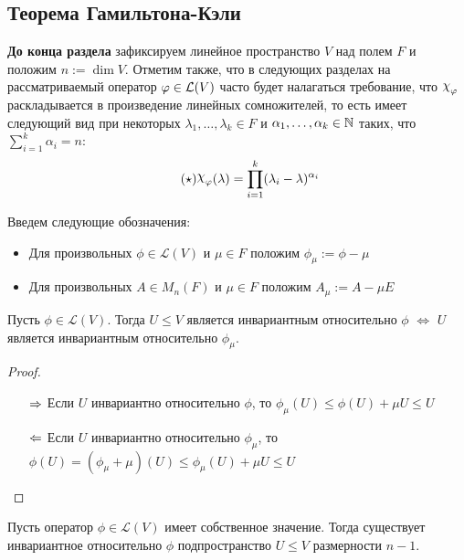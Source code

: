 \subsection{Теорема Гамильтона-Кэли}

\textbf{До конца раздела} зафиксируем линейное пространство $V$ над полем $F$ и положим $n := \dim{V}$. Отметим также, что в следующих разделах на рассматриваемый оператор $\phi \hm{\in} \mathcal{L}(V)$ часто будет налагаться требование, что $\Chi_\phi$ раскладывается в произведение линейных сомножителей, то есть имеет следующий вид при некоторых $\lambda_1, \dotsc, \lambda_k \in F$ и $\alpha_1, \dotsc, \alpha_k \in \mathbb{N}$ таких, что $\sum_{i = 1}^k\alpha_i = n$:
\begin{equation}\tag{$\star$}\label{charpol}
	\Chi_\phi(\lambda) = \prod_{i = 1}^k(\lambda_i - \lambda)^{\alpha_i}
\end{equation}

\begin{definition}
	Введем следующие обозначения:
	\begin{itemize}
		\item Для произвольных $\phi \in \mathcal{L}(V)$ и $\mu \in F$ положим $\phi_\mu := \phi - \mu$
		\item Для произвольных $A \in M_n(F)$ и $\mu \in F$ положим $A_\mu := A - \mu E$
	\end{itemize}
\end{definition}

\begin{proposition}
	Пусть $\phi \in \mathcal{L}(V)$. Тогда $U \le V$ является инвариантным относительно $\phi$ $\Leftrightarrow$ $U$ является инвариантным относительно $\phi_\mu$.
\end{proposition}

\begin{proof}~
	\begin{itemize}
		\item[$\Rightarrow$] Если $U$ инвариантно относительно $\phi$, то $\phi_\mu(U) \le \phi(U) + \mu U \le U$
		\item[$\Leftarrow$] Если $U$ инвариантно относительно $\phi_\mu$, то $\phi(U) = (\phi_\mu + \mu)(U) \le \phi_\mu(U) + \mu U \le U$\qedhere
	\end{itemize}
\end{proof}

\begin{proposition}
	Пусть оператор $\phi \in \mathcal{L}(V)$ имеет собственное значение. Тогда существует инвариантное относительно $\phi$ подпространство $U \le V$ размерности $n - 1$.
\end{proposition}

